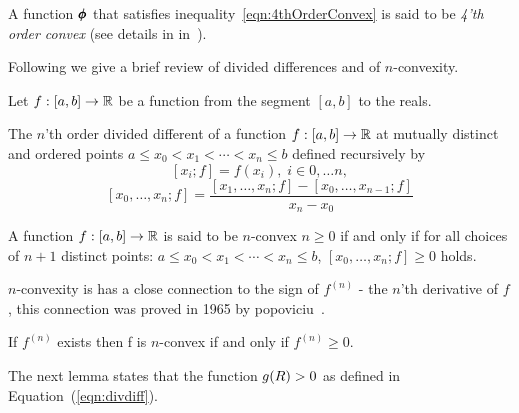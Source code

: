 \documentclass{article}[12pt]
\begin{document}
A function $\pmb{\phi}_{}$ that satisfies
inequality~\ref{eqn:4thOrderConvex} is said to be {\em 4'th order convex}
(see details in in~\cite{butt2016generalization}).


Following\cite{butt2016generalization} we give a brief review of
divided differences and of $n$-convexity.

Let $f:[a,b] \to \mathbb{R}$ be a function from the segment $[a,b]$ to the
reals.

\begin{definition}
  The $n$'th order divided different of a function $f:[a,b] \to
  \mathbb{R}$ at mutually distinct and ordered points $a \leq x_0 < x_1
  < \cdots < x_n \leq b$
  defined recursively by
  \[ [x_i; f] = f(x_i), \; i \in 0,\ldots n,\]
  \[ [x_0,\ldots,x_n;f] =
    \frac{[x_1,\ldots,x_n;f]-[x_0,\ldots,x_{n-1};f]}{x_n-x_0} \]
\end{definition}

\begin{definition}[$n$-convexity]
 A function $f:[a,b] \to \mathbb{R}$ is said to be $n$-convex  $n \geq 0$
 if and only if for all choices of $n+1$ distinct points: $a \leq x_0 < x_1
  < \cdots < x_n \leq b$, $[x_0,\ldots,x_n;f]\geq 0$ holds.
\end{definition}
$n$-convexity is has a close connection to the sign of $f^{(n)}$ - the $n$'th
derivative of $f$, this connection was proved in 1965 by
popoviciu~\cite{popoviciu1965certaines}.
\begin{theorem} \label{thm:popo}
If $f^{(n)}$ exists then f is $n$-convex if and only if $f^{(n)}\geq 0$.
\end{theorem}

The next lemma states that the function $g(R)>0$ as defined in
Equation~(\ref{eqn:divdiff}).
\end{document}
